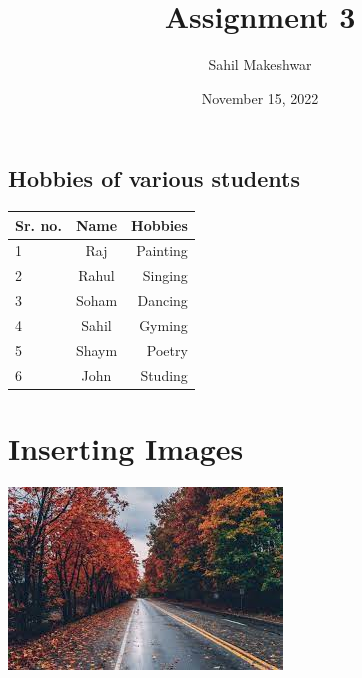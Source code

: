 \documentclass[12pt]{article}
\title{Assignment 3}
\author{Sahil Makeshwar}
\date{November 15, 2022}
\begin{document}
\newpage
\maketitle

\begin{table}

\begin{center}



\section{Hobbies of various students}



\begin{tabular}{|l|c|r|}

\textbf{Sr. no.} & 
\textbf{Name} &
\textbf{Hobbies}\\

\hline
1	 & 		Raj		     & 	Painting		\\
2	 & 		Rahul		 & 	Singing	\\
3	 & 		Soham    	 & 	Dancing		\\
4	 & 		Sahil   	 & 	Gyming		\\
5	 & 		Shaym	     & 	Poetry		\\
6	 & 		John	     & 	Studing		\\

\end{tabular}

\end{center}

\end{table}

\newpage
\section{Inserting Images}
\includegraphics[scale = 1.5]{latex image.jpeg}
\end{document}
